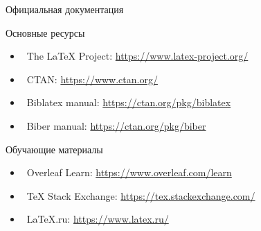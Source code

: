 \documentclass[aspectratio=169, 12pt]{beamer}
\begin{document}
\begin{frame}{Официальная документация}
  \begin{block}{Основные ресурсы}
    \begin{itemize}
      \item \faGlobe\ The LaTeX Project: \url{https://www.latex-project.org/}
      \item \faBook\ CTAN: \url{https://www.ctan.org/}
      \item \faFileAlt\ Biblatex manual: \url{https://ctan.org/pkg/biblatex}
      \item \faCog\ Biber manual: \url{https://ctan.org/pkg/biber}
    \end{itemize}
  \end{block}
  
  \begin{block}{Обучающие материалы}
    \begin{itemize}
      \item \faGraduationCap\ Overleaf Learn: \url{https://www.overleaf.com/learn}
      \item \faQuestionCircle\ TeX Stack Exchange: \url{https://tex.stackexchange.com/}
      \item \faUsers\ LaTeX.ru: \url{https://www.latex.ru/}
    \end{itemize}
  \end{block}
\end{frame}
\end{document}
